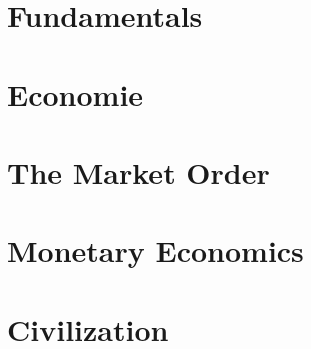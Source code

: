 \documentclass[smalldemyvopaper,10pt,twoside,onecolumn,openright,extrafontsizes]{memoir}
\makeatletter
\renewcommand\listoftables{%
        \@starttoc{lot}%
}
\renewcommand\listoffigures{%
        \@starttoc{lof}%
}
\makeatother
\begin{document}
\part{Fundamentals}



\part{Economie}



\part{The Market Order}
\part{Monetary Economics}
\part{Civilization}

\backmatter



\nocite{*} %
\printbibliography

\printindex
{}
\end{document}
